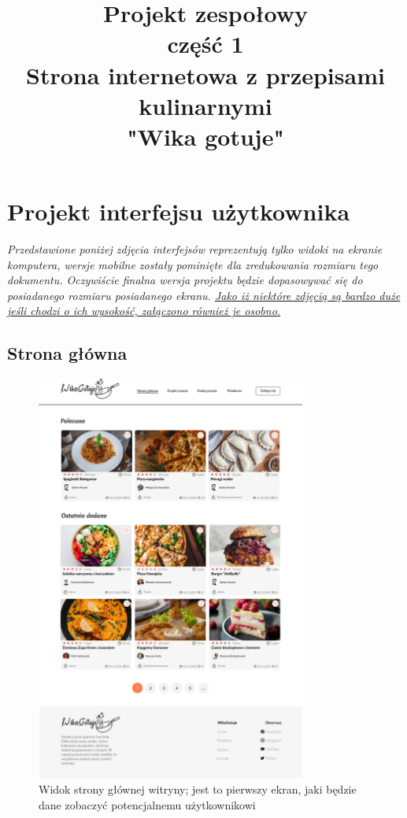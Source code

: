 \documentclass{article}
\title{\fontsize{20}{22}\selectfont Projekt zespołowy\\ część 1\\Strona internetowa z przepisami kulinarnymi\\"Wika gotuje"}
\date{}
\begin{document}
\section{Projekt interfejsu użytkownika}
\textit{Przedstawione poniżej zdjęcia interfejsów reprezentują tylko widoki na ekranie komputera, wersje mobilne zostały pominięte dla zredukowania rozmiaru tego dokumentu. Oczywiście
finalna wersja projektu będzie dopasowywać się do posiadanego rozmiaru posiadanego ekranu. \underline{Jako iż niektóre zdjęcią są bardzo duże jeśli chodzi o ich wysokość, załączono
również je osobno.}}

\subsection{Strona główna}
\begin{figure}[H]
    \begin{center}
        \includegraphics[width=0.79\textwidth]{mockups/main_page}
    \end{center}
    \caption{Widok strony głównej witryny; jest to pierwszy ekran, jaki będzie dane zobaczyć potencjalnemu użytkownikowi}
    \label{fig:main_page}
\end{figure}
    
\end{document}
